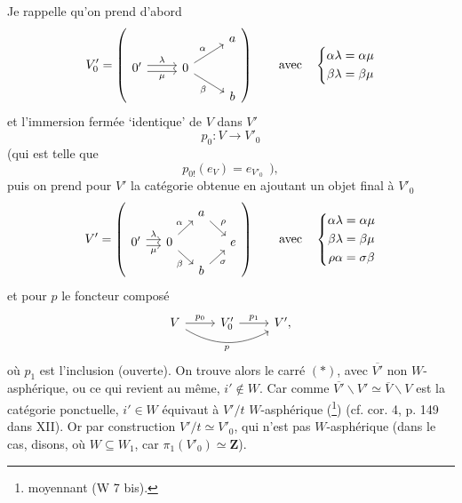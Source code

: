 Je rappelle qu'on prend d'abord
\[
V'_0 = \left(
\begin{tikzcd}[row sep=small]
 & & a \\
0' \arrow[r, shift left, "\lambda"] \arrow[r, shift right, "\mu"'] & 0 \arrow[ur, "\alpha"] \arrow[dr, "\beta"'] & \\
 & & b
\end{tikzcd}
\right)
\qquad \text{avec} \quad
\left\{
\begin{aligned}
\alpha\lambda &= \alpha\mu \\
\beta\lambda &= \beta\mu
\end{aligned}
\right.
\]
et l'immersion fermée ‘identique’ de $V$ dans $V'$
\[ p_0 : V \longrightarrow V'_0 \]
(qui est telle que
\[ p_{0!}(e_V) = e_{V'_0} \ \ ), \]
puis on prend pour $V'$ la catégorie obtenue en ajoutant un objet final à $V'_0$
\[
V' = \left(
\begin{tikzcd}[row sep=small, column sep=small]
 & & a \arrow[dr, "\rho"] & \\
0' \arrow[r, shift left, "\lambda"] \arrow[r, shift right, "\mu"'] & 0 \arrow[ur, "\alpha"] \arrow[dr, "\beta"'] & & e \\
 & & b \arrow[ur, "\sigma"'] &
\end{tikzcd}
\right)
\qquad \text{avec} \quad
\left\{
\begin{aligned}
\alpha\lambda &= \alpha\mu \\
\beta\lambda &= \beta\mu \\
\rho\alpha &= \sigma\beta
\end{aligned}
\right.
\]
et pour $p$ le foncteur composé
\[
\begin{tikzcd}
V \arrow[r, "p_0"] \arrow[rr, bend right, "p"'] & V'_0 \arrow[r, "p_1"] & V',
\end{tikzcd}
\]
où $p_1$ est l'inclusion (ouverte). On trouve alors le carré $(*)$, avec $\overline{V'}$ non $W$-asphérique, ou ce qui revient au même, $i' \notin W$. Car comme $\overline{V'}\backslash V' \simeq \overline{V}\backslash V$ est la catégorie ponctuelle, $i' \in W$ équivaut à $V'/t$ $W$-asphérique (\footnote[8]{moyennant (W 7 bis).}) (cf. cor. 4, p. 149 dans XII). Or par construction $V'/t \simeq V'_0$, qui n'est pas $W$-asphérique (dans le cas, disons, où $W \subseteq W_1$, car $\pi_1(V'_0) \simeq \mathbf{Z}$).

